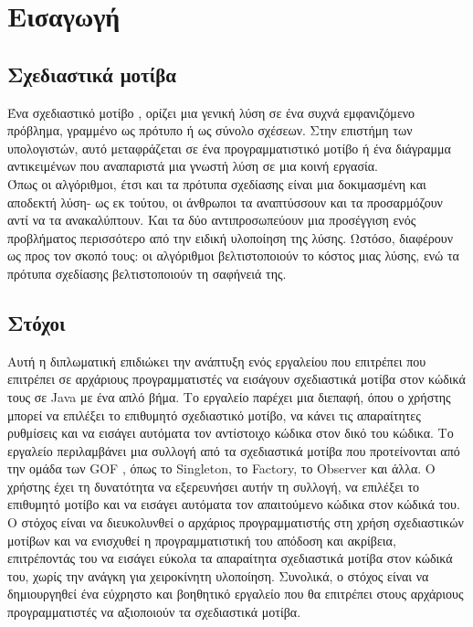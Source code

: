 \chapter{Εισαγωγή}
\label{ch:Introduction}
\section{Σχεδιαστικά μοτίβα}
\label{sec:patterns}
Ένα σχεδιαστικό μοτίβο \cite{GoF}, ορίζει μια γενική λύση σε ένα συχνά εμφανιζόμενο πρόβλημα, γραμμένο
ως πρότυπο ή ως σύνολο σχέσεων. Στην επιστήμη των υπολογιστών, αυτό μεταφράζεται σε ένα
προγραμματιστικό μοτίβο ή ένα διάγραμμα αντικειμένων που αναπαριστά μια γνωστή λύση σε μια
κοινή εργασία. \\
Όπως οι αλγόριθμοι, έτσι και τα πρότυπα σχεδίασης είναι μια δοκιμασμένη και αποδεκτή λύση-
ως εκ τούτου, οι άνθρωποι τα αναπτύσσουν και τα προσαρμόζουν αντί να τα ανακαλύπτουν.
Και τα δύο αντιπροσωπεύουν μια προσέγγιση ενός προβλήματος περισσότερο από την ειδική
υλοποίηση της λύσης. Ωστόσο, διαφέρουν ως προς τον σκοπό τους: οι αλγόριθμοι βελτιστοποιούν
το κόστος μιας λύσης, ενώ τα πρότυπα σχεδίασης βελτιστοποιούν τη σαφήνειά της.
\section{Στόχοι}
\label{sec:Objectives}
Αυτή η διπλωματική επιδιώκει την ανάπτυξη ενός εργαλείου που επιτρέπει που επιτρέπει σε αρχάριους προγραμματιστές να εισάγουν 
σχεδιαστικά μοτίβα στον κώδικά τους σε Java με ένα απλό βήμα. Το εργαλείο παρέχει μια διεπαφή, όπου ο χρήστης μπορεί να 
επιλέξει το επιθυμητό σχεδιαστικό μοτίβο, να κάνει τις απαραίτητες ρυθμίσεις και να εισάγει αυτόματα τον αντίστοιχο 
κώδικα στον δικό του κώδικα. Το εργαλείο περιλαμβάνει μια συλλογή από τα σχεδιαστικά μοτίβα που προτείνονται από την ομάδα των 
GOF \cite{GoF}, 
όπως το Singleton, το Factory, το Observer και άλλα. Ο χρήστης έχει τη δυνατότητα να εξερευνήσει αυτήν τη συλλογή, 
να επιλέξει το επιθυμητό μοτίβο και να εισάγει αυτόματα τον απαιτούμενο κώδικα στον κώδικά του. Ο στόχος είναι να διευκολυνθεί 
ο αρχάριος προγραμματιστής στη χρήση σχεδιαστικών μοτίβων και να ενισχυθεί η προγραμματιστική του απόδοση και ακρίβεια, 
επιτρέποντάς του να εισάγει εύκολα τα απαραίτητα σχεδιαστικά μοτίβα στον κώδικά του, χωρίς την ανάγκη για χειροκίνητη υλοποίηση. 
Συνολικά, ο στόχος είναι να δημιουργηθεί ένα εύχρηστο και βοηθητικό εργαλείο που θα επιτρέπει στους αρχάριους προγραμματιστές 
να αξιοποιούν τα σχεδιαστικά μοτίβα.
